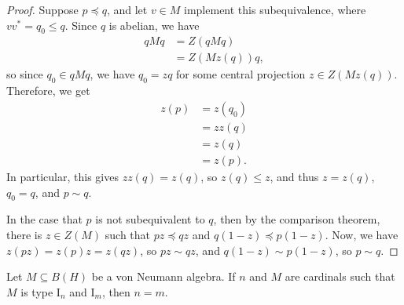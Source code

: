 \documentclass[10pt]{mypackage}
\begin{document}
\begin{proof}
  Suppose $p\preceq q$, and let $v\in M$ implement this subequivalence, where $vv^{\ast} = q_0\leq q$. Since $q$ is abelian, we have
  \begin{align*}
    qMq &= Z\left( qMq \right)\\
        &= Z\left( Mz(q) \right)q,
  \end{align*}
  so since $q_0\in qMq$, we have $q_0 = zq$ for some central projection $z\in Z\left( Mz(q) \right)$. Therefore, we get
  \begin{align*}
    z(p) &= z\left( q_0 \right)\\
         &= zz\left( q \right)\\
         &= z(q)\\
         &= z(p).
  \end{align*}
  In particular, this gives $zz\left( q \right) = z\left( q \right)$, so $z(q)\leq z$, and thus $z = z(q)$, $q_0 = q$, and $p\sim q$.

  In the case that $p$ is not subequivalent to $q$, then by the comparison theorem, there is $z\in Z(M)$ such that $pz\preceq qz$ and $q\left( 1-z \right)\preceq p\left( 1-z \right)$. Now, we have $z\left( pz \right) = z\left( p \right)z = z\left( qz \right)$, so $pz\sim qz$, and $q\left( 1-z \right)\sim p\left( 1-z \right)$, so $p\sim q$.
\end{proof}
\begin{lemma}
  Let $M\subseteq B(H)$ be a von Neumann algebra. If $n$ and $M$ are cardinals such that $M$ is type $\text{I}_n$ and $\text{I}_m$, then $n = m$.
\end{lemma}
\end{document}
